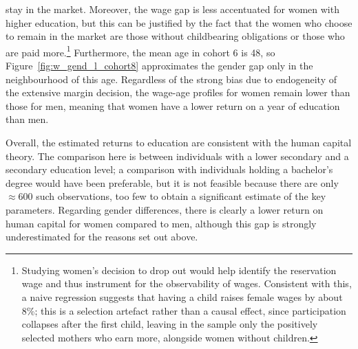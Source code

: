 \documentclass[12pt]{article}
\begin{document}
stay in the market. Moreover, the wage gap is less accentuated for women with higher education, but this can be justified by the
fact that the women who choose to remain in the market are those without childbearing obligations or those who are
paid more.\footnote{Studying women's decision to drop out would help identify the reservation wage and thus instrument
for the observability of wages. Consistent with this, a naive regression suggests that having a child raises female
wages by about 8\%; this is a selection artefact rather than a causal effect, since participation collapses after the
first child, leaving in the sample only the positively selected mothers who earn more, alongside women without
children.} Furthermore, the mean age in cohort 6 is 48, so Figure~\ref{fig:w_gend_l_cohort8} approximates the gender gap
only in the neighbourhood of this age. Regardless of the strong bias due to endogeneity of the extensive margin
decision, the wage-age profiles for women remain lower than those for men, meaning that women have a lower return on a
year of education than men.
\par
Overall, the estimated returns to education are consistent with the human capital theory. The comparison here is between
individuals with a lower secondary and a secondary education level; a comparison with individuals holding a bachelor's
degree would have been preferable, but it is not feasible because there are only $\approx 600$ such observations, too
few to obtain a significant estimate of the key parameters. Regarding gender differences, there is clearly a lower
return on human capital for women compared to men, although this gap is strongly underestimated for the reasons set out
above.
\end{document}
